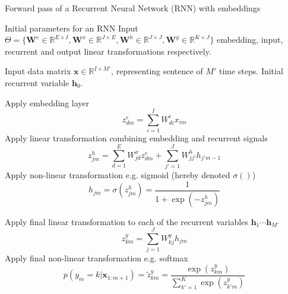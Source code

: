 \begin{algorithm}[th!]
   \caption{Forward pass of a Recurrent Neural Network (RNN) with embeddings}
\begin{algorithmic}[1]
\label{algo:rnnforward}

    Initial parameters for an RNN Input
$\Theta=\{\mathbf{W}^e \in \mathbb{R}^{E \times I}, \mathbf{W}^x \in \mathbb{R}^{J \times E}, \mathbf{W}^h \in \mathbb{R}^{J \times J}, \mathbf{W}^y \in \mathbb{R}^{K \times J} \}$ embedding, input, recurrent and output linear transformations respectively.

    Input data matrix $\mathbf{x} \in \mathbb{R}^{I \times M'}$, representing sentence of $M'$ time steps. Initial recurrent variable $\mathbf{h}_0$. 

        \STATE Apply embedding layer
        $$z_{dm}^e = \sum_{i=1}^{I} W^e_{di} x_{im}$$
     \STATE Apply linear transformation combining embedding and recurrent signals
        $$z_{jm}^h = \sum_{d=1}^{E} W_{jd}^x z_{dm}^e + \sum_{j'=1}^{J} W_{jj'}^h h_{j'm-1}$$
     \STATE Apply non-linear transformation e.g. sigmoid (hereby denoted $\sigma()$)
        $$h_{jm} = \sigma(z_{jm}^h)  = \frac{1}{1+\exp(-z_{jm}^h)}$$

	\ENDFOR

        \STATE Apply final linear transformation to each of the recurrent variables $\mathbf{h}_1 \cdots \mathbf{h}_{M'}$ 
$$z_{km}^y = \sum_{j=1}^{J} W_{kj}^y h_{jm}$$
\STATE Apply final non-linear transformation e.g. softmax 
   $$p(y_m=k|\mathbf{x}_{1:m+1}) = \tilde{z}_{km}^y  = \frac{\exp(z_{km}^y)}{\sum_{k'=1}^{K} \exp(z_{k'm}^y)}$$
\end{algorithmic}
\end{algorithm}


